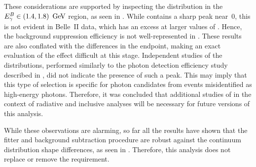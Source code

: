 These considerations are supported by inspecting the \ZMVA distribution in the \mbox{${E^B_{\gamma}}\in(1.4,1.8)~\mathrm{\,Ge\kern -0.1em V}$} region, as seen in .
While \MC contains a sharp peak near~0, this is not evident in Belle~II data, which has an excess at larger values of \ZMVA.
Hence, the background suppression efficiency is not well-represented in \MC.
These results are also conflated with the differences in the \Mbc endpoint, making an exact evaluation of the effect difficult at this stage.
Independent studies of the \ZMVA distributions, performed similarly to the photon detection efficiency study described in , did not indicate the presence of such a peak.
This may imply that this type of selection is specific for photon candidates from \BB events misidentified as high-energy photons.
Therefore, it was concluded that additional studies of \ZMVA in the context of radiative and inclusive analyses will be necessary for future versions of this analysis.

While these observations are alarming, so far all the results have shown that the \Mbc fitter and background subtraction procedure are robust against the
continuum \Mbc distribution shape differences, as seen in .
Therefore, this analysis does not replace or remove the \ZMVA requirement.

